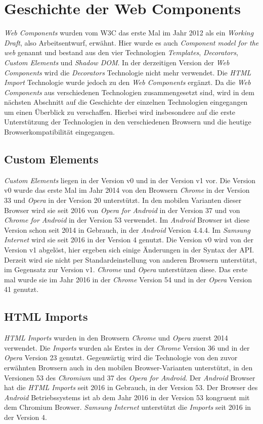 \documentclass[12pt, paper=a4, bibtotoc, toc=listof, headsepline=true]{scrreprt}
\begin{document}
	\section{Geschichte der Web Components}
	\label{ref:gesVonWebCom}
	\emph{Web Components} wurden vom \ac{W3C} das erste Mal im Jahr 2012 als ein \emph{Working Draft}, also Arbeitsentwurf, erwähnt. Hier wurde es auch \emph{Component model for the web} genannt und bestand aus den vier Technologien \emph{Templates}, \emph{Decorators}, \emph{Custom Elements} und \emph{Shadow DOM}. In der derzeitigen Version der \emph{Web Components} wird die \emph{Decorators} Technologie nicht mehr verwendet. Die \emph{\ac{HTML} Import} Technologie wurde jedoch zu den \emph{Web Components} ergänzt\cite{Cooney2012}. Da die \emph{Web Components} aus verschiedenen Technologien zusammengesetzt sind, wird in dem nächsten Abschnitt auf die Geschichte der einzelnen Technologien eingegangen um einen Überblick zu verschaffen. Hierbei wird insbesondere auf die erste Unterstützung der Technologien in den verschiedenen Browsern und die heutige Browserkompatibilität eingegangen.
		\subsection{Custom Elements}
		\emph{Custom Elements} liegen in der Version v0 und in der Version v1 vor. Die Version v0 wurde das erste Mal im Jahr 2014 von den Browsern \emph{Chrome} in der Version 33 und \emph{Opera} in der Version 20 unterstützt. In den mobilen Varianten dieser Browser  wird sie seit 2016 von \emph{Opera for Android} in der Version 37 und von \emph{Chrome for Android} in der Version 53 verwendet\cite{C2015}. Im \emph{Android} Browser ist diese Version schon seit 2014 in Gebrauch, in der \emph{Android} Version 4.4.4. Im \emph{Samsung Internet} wird sie seit 2016 in der Version 4 genutzt\cite{cusEleCanIUse}. Die Version v0 wird von der Version v1 abgelöst, hier ergeben sich einige Änderungen in der Syntax der \ac{API}\cite{Bidelman2016cusElev1}. Derzeit wird sie nicht per Standardeinstellung von anderen Browsern unterstützt\cite{firefox}, im Gegensatz zur Version v1. \emph{Chrome} und \emph{Opera} unterstützen diese. Das erste mal wurde sie im Jahr 2016 in der \emph{Chrome} Version 54 und in der \emph{Opera} Version 41 genutzt\cite{C2016}.
		\subsection{HTML Imports}
		\emph{\ac{HTML} Imports} wurden in den Browsern \emph{Chrome} und \emph{Opera} zuerst 2014 verwendet. Die \emph{Imports} wurden als Erstes in der \emph{Chrome} Version 36 und in der \emph{Opera} Version 23 genutzt. Gegenwärtig wird die Technologie von den zuvor erwähnten Browsern auch in den mobilen Browser-Varianten unterstützt, in den Versionen 53 des \emph{Chromium} und 37 des \emph{Opera for Android}\cite{Morrita2015}. Der \emph{Android} Browser hat die  \emph{\ac{HTML} Imports} seit 2016 in Gebrauch, in der Version 53. Der Browser des \emph{Android} Betriebssystems ist ab dem Jahr 2016 in der Version 53 kongruent mit dem Chromium Browser. \emph{Samsung Internet} unterstützt die \emph{Imports} seit 2016 in der Version 4\cite{htmlTemplCaniuse}.
\end{document}

